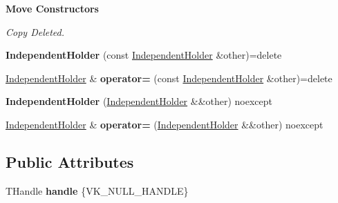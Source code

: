 \begin{Indent}\textbf{ Move Constructors}\par
{\em Copy Deleted. }\begin{DoxyCompactItemize}
\item 
\mbox{\label{structblaze_1_1vkw_1_1base_1_1IndependentHolder_aa06c4a50a24b4bcc2e7ea4b149f19f26}} 
{\bfseries Independent\+Holder} (const \hyperlink{structblaze_1_1vkw_1_1base_1_1IndependentHolder}{Independent\+Holder} \&other)=delete
\item 
\mbox{\label{structblaze_1_1vkw_1_1base_1_1IndependentHolder_a459af3de3f9e749cf50e42879f7d3ed0}} 
\hyperlink{structblaze_1_1vkw_1_1base_1_1IndependentHolder}{Independent\+Holder} \& {\bfseries operator=} (const \hyperlink{structblaze_1_1vkw_1_1base_1_1IndependentHolder}{Independent\+Holder} \&other)=delete
\item 
\mbox{\label{structblaze_1_1vkw_1_1base_1_1IndependentHolder_ab4ec5db4b4d8cbfe4ea93f8a89140044}} 
{\bfseries Independent\+Holder} (\hyperlink{structblaze_1_1vkw_1_1base_1_1IndependentHolder}{Independent\+Holder} \&\&other) noexcept
\item 
\mbox{\label{structblaze_1_1vkw_1_1base_1_1IndependentHolder_ae7b9cb54adb933d76d0a5c2ac232067e}} 
\hyperlink{structblaze_1_1vkw_1_1base_1_1IndependentHolder}{Independent\+Holder} \& {\bfseries operator=} (\hyperlink{structblaze_1_1vkw_1_1base_1_1IndependentHolder}{Independent\+Holder} \&\&other) noexcept
\end{DoxyCompactItemize}
\end{Indent}
\subsection*{Public Attributes}
\begin{DoxyCompactItemize}
\item 
\mbox{\label{structblaze_1_1vkw_1_1base_1_1IndependentHolder_a0d9ceb37253a26fcefeb5eefa8b568f1}} 
T\+Handle {\bfseries handle} \{V\+K\+\_\+\+N\+U\+L\+L\+\_\+\+H\+A\+N\+D\+LE\}
\end{DoxyCompactItemize}


